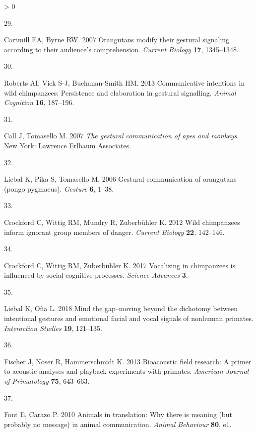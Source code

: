 \documentclass[
  english,
  man,floatsintext]{apa6}
\newlength{\cslhangindent}
\newlength{\csllabelwidth}
\newenvironment{CSLReferences}[2] %
 {%
  \setlength{\parindent}{0pt}
  \ifodd #1 \everypar{\setlength{\hangindent}{\cslhangindent}}\ignorespaces\fi
  \ifnum #2 > 0
  \setlength{\parskip}{#2\baselineskip}
  \fi
 }%
 {}
\newcommand{\CSLLeftMargin}[1]{\parbox[t]{\csllabelwidth}{#1}}
\newcommand{\CSLRightInline}[1]{\parbox[t]{\linewidth - \csllabelwidth}{#1}\break}
\begin{document}
\begin{CSLReferences}{0}{0}
\leavevmode\hypertarget{ref-cartmill2007orangutans}{}%
\CSLLeftMargin{29. }
\CSLRightInline{Cartmill EA, Byrne RW. 2007 Orangutans modify their gestural signaling according to their audience's comprehension. \emph{Current Biology} \textbf{17}, 1345--1348.}

\leavevmode\hypertarget{ref-roberts2013communicative}{}%
\CSLLeftMargin{30. }
\CSLRightInline{Roberts AI, Vick S-J, Buchanan-Smith HM. 2013 Communicative intentions in wild chimpanzees: Persistence and elaboration in gestural signalling. \emph{Animal Cognition} \textbf{16}, 187--196.}

\leavevmode\hypertarget{ref-call2007gestural}{}%
\CSLLeftMargin{31. }
\CSLRightInline{Call J, Tomasello M. 2007 \emph{The gestural communication of apes and monkeys}. New York: Lawrence Erlbaum Associates. }

\leavevmode\hypertarget{ref-liebal2006gestural}{}%
\CSLLeftMargin{32. }
\CSLRightInline{Liebal K, Pika S, Tomasello M. 2006 Gestural communication of orangutans (pongo pygmaeus). \emph{Gesture} \textbf{6}, 1--38.}

\leavevmode\hypertarget{ref-crockford2012wild}{}%
\CSLLeftMargin{33. }
\CSLRightInline{Crockford C, Wittig RM, Mundry R, Zuberbühler K. 2012 Wild chimpanzees inform ignorant group members of danger. \emph{Current Biology} \textbf{22}, 142--146.}

\leavevmode\hypertarget{ref-crockford2017vocalizing}{}%
\CSLLeftMargin{34. }
\CSLRightInline{Crockford C, Wittig RM, Zuberbühler K. 2017 Vocalizing in chimpanzees is influenced by social-cognitive processes. \emph{Science Advances} \textbf{3}.}

\leavevmode\hypertarget{ref-liebal2018mind}{}%
\CSLLeftMargin{35. }
\CSLRightInline{Liebal K, Oña L. 2018 Mind the gap--moving beyond the dichotomy between intentional gestures and emotional facial and vocal signals of nonhuman primates. \emph{Interaction Studies} \textbf{19}, 121--135.}

\leavevmode\hypertarget{ref-fischer2013bioacoustic}{}%
\CSLLeftMargin{36. }
\CSLRightInline{Fischer J, Noser R, Hammerschmidt K. 2013 Bioacoustic field research: A primer to acoustic analyses and playback experiments with primates. \emph{American Journal of Primatology} \textbf{75}, 643--663.}

\leavevmode\hypertarget{ref-font2010animals}{}%
\CSLLeftMargin{37. }
\CSLRightInline{Font E, Carazo P. 2010 Animals in translation: Why there is meaning (but probably no message) in animal communication. \emph{Animal Behaviour} \textbf{80}, e1.}


\end{CSLReferences}
\end{document}
